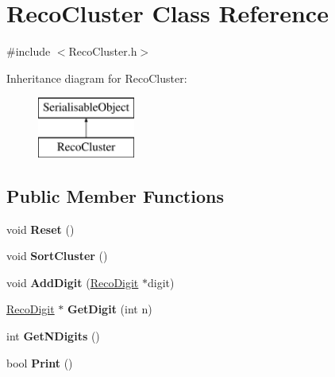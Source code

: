 \hypertarget{classRecoCluster}{\section{Reco\-Cluster Class Reference}
\label{classRecoCluster}
}


{\ttfamily \#include $<$Reco\-Cluster.\-h$>$}

Inheritance diagram for Reco\-Cluster\-:\begin{figure}[H]
\begin{center}
\leavevmode
\includegraphics[height=2.000000cm]{classRecoCluster}
\end{center}
\end{figure}
\subsection*{Public Member Functions}
\begin{DoxyCompactItemize}
\item 
\hypertarget{classRecoCluster_a615607869a350cf1997517b327301ec7}{void {\bfseries Reset} ()}\label{classRecoCluster_a615607869a350cf1997517b327301ec7}

\item 
\hypertarget{classRecoCluster_a51c5dfdb4b5555485ea67c678002d5d5}{void {\bfseries Sort\-Cluster} ()}\label{classRecoCluster_a51c5dfdb4b5555485ea67c678002d5d5}

\item 
\hypertarget{classRecoCluster_aa8ce1a0622570b319cf47662d9cf4209}{void {\bfseries Add\-Digit} (\hyperlink{classRecoDigit}{Reco\-Digit} $\ast$digit)}\label{classRecoCluster_aa8ce1a0622570b319cf47662d9cf4209}

\item 
\hypertarget{classRecoCluster_af9e9403e3b26e05d57b5b35c79f355f9}{\hyperlink{classRecoDigit}{Reco\-Digit} $\ast$ {\bfseries Get\-Digit} (int n)}\label{classRecoCluster_af9e9403e3b26e05d57b5b35c79f355f9}

\item 
\hypertarget{classRecoCluster_a4c1377575f643fb8214735f8d90570dd}{int {\bfseries Get\-N\-Digits} ()}\label{classRecoCluster_a4c1377575f643fb8214735f8d90570dd}

\item 
\hypertarget{classRecoCluster_aad8d0d73814c3a4f487239050d68fc0a}{bool {\bfseries Print} ()}\label{classRecoCluster_aad8d0d73814c3a4f487239050d68fc0a}

\end{DoxyCompactItemize}
